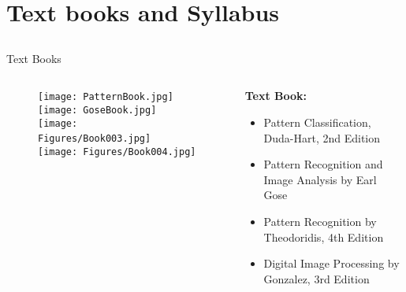 \section{Text books and Syllabus}
\subsection{}


\begin{frame}{Text Books}
\begin{columns}
\begin{column}{5cm}
\begin{figure}
\centering
\texttt{[image: PatternBook.jpg]}~~
\texttt{[image: GoseBook.jpg]}\\
\vspace{8pt}
\texttt{[image: Figures/Book003.jpg]}~~
\texttt{[image: Figures/Book004.jpg]}
\end{figure}
\end{column}
\begin{column}{5.4cm}
\begin{footnotesize}
\textbf{Text Book:}
\begin{itemize}
\item Pattern Classification, Duda-Hart, 2nd Edition
\item Pattern Recognition and Image Analysis by Earl Gose
\item Pattern Recognition by Theodoridis, 4th Edition
\item Digital Image Processing by Gonzalez, 3rd Edition
\end{itemize}
\end{footnotesize}
\end{column}
\end{columns}
\end{frame}

